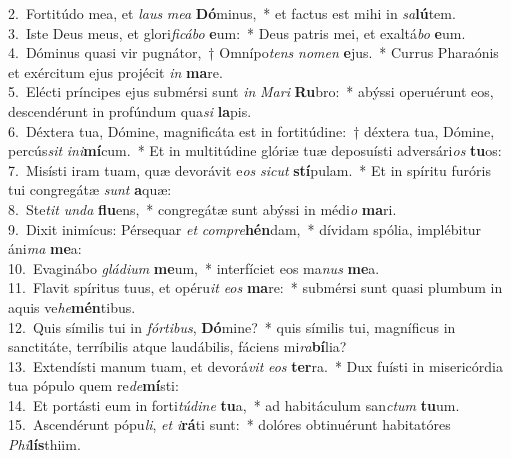 {2.~}Fortitúdo mea, et \textit{laus} \textit{me}\textit{a} \textbf{Dó}minus,~* et factus est mihi in \textit{sa}\textbf{lú}tem.\\
{3.~}Iste Deus meus, et glori\textit{fi}\textit{cá}\textit{bo} \textbf{e}um:~* Deus patris mei, et exaltá\textit{bo} \textbf{e}um.\\
{4.~}Dóminus quasi vir pugnátor,~† Omnípo\textit{tens} \textit{no}\textit{men} \textbf{e}jus.~* Currus Pharaónis et exércitum ejus projécit \textit{in} \textbf{ma}re.\\
{5.~}Elécti príncipes ejus submérsi sunt \textit{in} \textit{Ma}\textit{ri} \textbf{Ru}bro:~* abýssi operuérunt eos, descendérunt in profúndum qua\textit{si} \textbf{la}pis.\\
{6.~}Déxtera tua, Dómine, magnificáta est in fortitúdine:~† déxtera tua, Dómine, percús\textit{sit} \textit{i}\textit{ni}\textbf{mí}cum.~* Et in multitúdine glóriæ tuæ deposuísti adversári\textit{os} \textbf{tu}os:\\
{7.~}Misísti iram tuam, quæ devorávit e\textit{os} \textit{si}\textit{cut} \textbf{stí}pulam.~* Et in spíritu furóris tui congregátæ \textit{sunt} \textbf{a}quæ:\\
{8.~}Ste\textit{tit} \textit{un}\textit{da} \textbf{flu}ens,~* congregátæ sunt abýssi in médi\textit{o} \textbf{ma}ri.\\
{9.~}Dixit inimícus: Pérsequar \textit{et} \textit{com}\textit{pre}\textbf{hén}dam,~* dívidam spólia, implébitur áni\textit{ma} \textbf{me}a:\\
{10.~}Evaginábo \textit{glá}\textit{di}\textit{um} \textbf{me}um,~* interfíciet eos ma\textit{nus} \textbf{me}a.\\
{11.~}Flavit spíritus tuus, et opéru\textit{it} \textit{e}\textit{os} \textbf{ma}re:~* submérsi sunt quasi plumbum in aquis ve\textit{he}\textbf{mén}tibus.\\
{12.~}Quis símilis tui in \textit{fór}\textit{ti}\textit{bus}, \textbf{Dó}mine?~* quis símilis tui, magníficus in sanctitáte, terríbilis atque laudábilis, fáciens mi\textit{ra}\textbf{bí}lia?\\
{13.~}Extendísti manum tuam, et devorá\textit{vit} \textit{e}\textit{os} \textbf{ter}ra.~* Dux fuísti in misericórdia tua pópulo quem re\textit{de}\textbf{mí}sti:\\
{14.~}Et portásti eum in forti\textit{tú}\textit{di}\textit{ne} \textbf{tu}a,~* ad habitáculum san\textit{ctum} \textbf{tu}um.\\
{15.~}Ascendérunt pópu\textit{li}, \textit{et} \textit{i}\textbf{rá}ti sunt:~* dolóres obtinuérunt habitatóres \textit{Phi}\textbf{lís}thiim.\\
